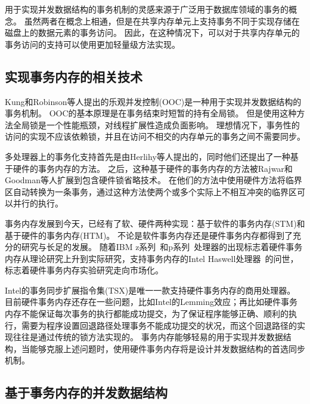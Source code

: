 用于实现并发数据结构的事务机制的灵感来源于广泛用于数据库领域的事务的概念。
虽然两者在概念上相通，但是在共享内存单元上支持事务不同于实现存储在磁盘上的数据元素的事务访问。
因此，在这种情况下，可以对于共享内存单元的事务访问的支持可以使用更加轻量级方法实现。

\subsection{实现事务内存的相关技术}
Kung和Robinson等人提出的乐观并发控制(OOC)\cite{kung1981optimistic}是一种用于实现并发数据结构的事务机制。
OOC的基本原理是在事务结束时短暂的持有全局锁。
但是使用这种方法全局锁是一个性能瓶颈，对线程扩展性造成负面影响。
理想情况下，事务性的访问的实现不应该依赖锁，并且在访问不相交的内存单元的事务之间不需要同步。

多处理器上的事务化支持首先是由Herlihy等人\cite{herlihy1993transactional}提出的，同时他们还提出了一种基于硬件的事务内存的方法。
之后，这种基于硬件的事务内存的方法被Rajwar和Goodman等人扩展到包含硬件锁省略技术\cite{rajwar2001speculative,rajwar2002transactional}。
在他们的方法中使用硬件方法将临界区自动转换为一条事务，通过这种方法使两个或多个实际上不相互冲突的临界区可以并行的执行。

事务内存发展到今天，已经有了软、硬件两种实现：基于软件的事务内存(STM)和基于硬件的事务内存(HTM)。
不论是软件事务内存\cite{spear2010lightweight,saha2006mcrt,shavit1997software}还是硬件事务内存\cite{yen2007logtm,moore2006logtm,dalessandro2011hybrid}都得到了充分的研究与长足的发展。
随着IBM z系列~\cite{Cain2013Robust}和p系列~\cite{Wang2012Evaluation}处理器的出现标志着硬件事务内存从理论研究上升到实际研究，支持事务内存的Intel Haswell处理器~\cite{Intel2015Intel}的问世，标志着硬件事务内存实验研究走向市场化。

Intel的事务同步扩展指令集(TSX)是唯一一款支持硬件事务内存的商用处理器。
目前硬件事务内存还存在一些问题，比如Intel的Lemming效应\cite{Afek2014Software}；再比如硬件事务内存不能保证每次事务的执行都能成功提交，为了保证程序能够正确、顺利的执行，需要为程序设置回退路径处理事务不能成功提交的状况，而这个回退路径的实现往往是通过传统的锁方法实现的。
事务内存能够轻易的用于实现并发数据结构，当能够克服上述问题时，使用硬件事务内存将是设计并发数据结构的首选同步机制。

\subsection{基于事务内存的并发数据结构}

